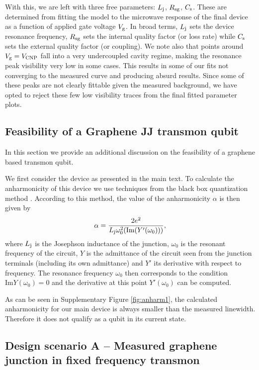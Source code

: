 With this, we are left with three free parameters: $L_{\rm j}$, $R_{\rm sg}$, $C_{\rm s}$.
These are determined from fitting the model to the microwave response of the final device as a function of applied gate voltage $V_{\rm g}$.
In broad terms, $L_{\rm j}$ sets the device resonance frequency, $R_{\rm sg}$ sets the internal quality factor (or loss rate) while $C_{\rm s}$ sets the external quality factor (or coupling).
We note also that points around $V_{\rm g} = V_{\rm CNP}$ fall into a very undercoupled cavity regime, making the resonance peak visibility very low in some cases.
This results in some of our fits not converging to the measured curve and producing absurd results.
Since some of these peaks are not clearly fittable given the measured background, we have opted to reject these few low visibility traces from the final fitted parameter plots.

\subsection{Feasibility of a Graphene JJ transmon qubit}\label{sec:feasability}
\noindent In this section we provide an additional discussion on the feasibility of a graphene based transmon qubit.

We first consider the device as presented in the main text.
To calculate the anharmonicity of this device we use techniques from the black box quantization method \cite{nigg_blackbox_2012}.
According to this method, the value of the anharmonicity $\alpha$ is then given by
\begin{equation}
\alpha = \frac{2e^2}{L_{\rm j}\omega_0^2(\textrm{Im}(Y'(\omega_0)))},
\end{equation}
where $L_{\rm j}$ is the Josephson inductance of the junction, $\omega_0$ is the resonant frequency of the circuit, $Y$ is the admittance of the circuit seen from the junction terminals (including its own admittance) and $Y'$ its derivative with respect to frequency.
The resonance frequency $\omega_0$ then corresponds to the condition $\textrm{Im}Y(\omega_0) = 0$ and the derivative at this point $Y'(\omega_0)$ can be computed.

As can be seen in Supplementary Figure \ref{fig:anharm1}, the calculated anharmonicity for our main device is always smaller than the measured linewidth.
Therefore it does not qualify as a qubit in its current state.



\subsection{Design scenario A -- Measured graphene junction in fixed frequency transmon}\label{sec:scenA}

